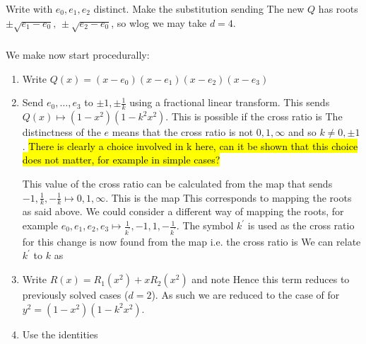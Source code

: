 \documentclass{article}
\begin{document}
\subsubsection{}
Write 
with $e_0,e_1,e_2$ distinct. Make the substitution 
sending 
The new $Q$ has roots $\pm \sqrt{e_1 - e_0}, \, \pm\sqrt{e_2 - e_0}$, so wlog we may take $d=4$.
\subsubsection{}
We make now start procedurally:
\begin{enumerate}
	\item Write $Q(x) = (x-e_0)(x-e_1)(x-e_2)(x-e_3)$
	\item Send $e_0, \dots, e_3$ to $\pm1, \pm \frac{1}{k}$ using a fractional linear transform. This sends $Q(x) \mapsto (1-x^2)(1-k^2 x^2)$. This is possible if the cross ratio is 
The distinctness of the $e$ means that the cross ratio is not $0,1,\infty$ and so $k \neq 0, \pm 1$. \hl{There is clearly a choice involved in k here, can it be shown that this choice does not matter, for example in simple cases?}
\begin{remark}
	This value of the cross ratio can be calculated from the map that sends $-1 ,\frac{1}{k}, -\frac{1}{k} \mapsto 0,1,\infty$. This is the map 
This corresponds to mapping the roots as said above. We could consider a different way of mapping the roots, for example $e_0, e_1, e_2, e_3 \mapsto \frac{1}{k^\prime},-1,1,-\frac{1}{k^\prime}$. The symbol $k^\prime$ is used as the cross ratio for this change is now found from the map 
i.e. the cross ratio is 
We can relate $k^\prime$ to $k$ as 
\end{remark}
\item Write $R(x) = R_1(x^2) + xR_2(x^2)$ and note 
Hence this term reduces to previously solved cases ($d=2$). As such we are reduced to the case of
for $y^2 = (1-x^2)(1-k^2 x^2)$. 
\item Use the identities 

\end{enumerate}
\end{document}
